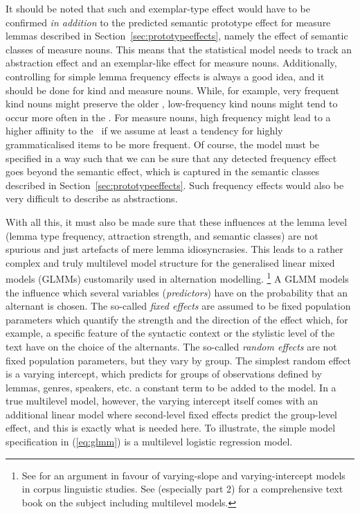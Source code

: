 It should be noted that such and exemplar-type effect would have to be confirmed \textit{in addition} to the predicted semantic prototype effect for measure lemmas described in Section~\ref{sec:prototypeeffects}, namely the effect of semantic classes of measure nouns.
This means that the statistical model needs to track an abstraction effect and an exemplar-like effect for measure nouns.
Additionally, controlling for simple lemma frequency effects is always a good idea, and it should be done for kind and measure nouns.
While, for example, very frequent kind nouns might preserve the older \PGCa, low-frequency kind nouns might tend to occur more often in the \NACa.
For measure nouns, high frequency might lead to a higher affinity to the \NACa\ if we assume at least a tendency for highly grammaticalised items to be more frequent.
Of course, the model must be specified in a way such that we can be sure that any detected frequency effect goes beyond the semantic effect, which is captured in the semantic classes described in Section~\ref{sec:prototypeeffects}.
Such frequency effects would also be very difficult to describe as abstractions.

With all this, it must also be made sure that these influences at the lemma level (lemma type frequency, attraction strength, and semantic classes) are not spurious and just artefacts of mere lemma idiosyncrasies.
This leads to a rather complex and truly multilevel model structure for the generalised linear mixed models (GLMMs) customarily used in alternation modelling.%
\footnote{See \citet{Gries2015} for an argument in favour of varying-slope and varying-intercept models in corpus linguistic studies.
See \citet{GelmanHill2006} (especially part 2) for a comprehensive text book on the subject including multilevel models.}
A GLMM models the influence which several variables (\textit{predictors}) have on the probability that an alternant is chosen.
The so-called \textit{fixed effects} are assumed to be fixed population parameters which quantify the strength and the direction of the effect which, for example, a specific feature of the syntactic context or the stylistic level of the text have on the choice of the alternants.
The so-called \textit{random effects} are not fixed population parameters, but they vary by group.
The simplest random effect is a varying intercept, which predicts for groups of observations defined by lemmas, genres, speakers, etc. a constant term to be added to the model.
In a true multilevel model, however, the varying intercept itself comes with an additional linear model where second-level fixed effects predict the group-level effect, and this is exactly what is needed here.
To illustrate, the simple model specification in (\ref{eq:glmm}) is a multilevel logistic regression model.

